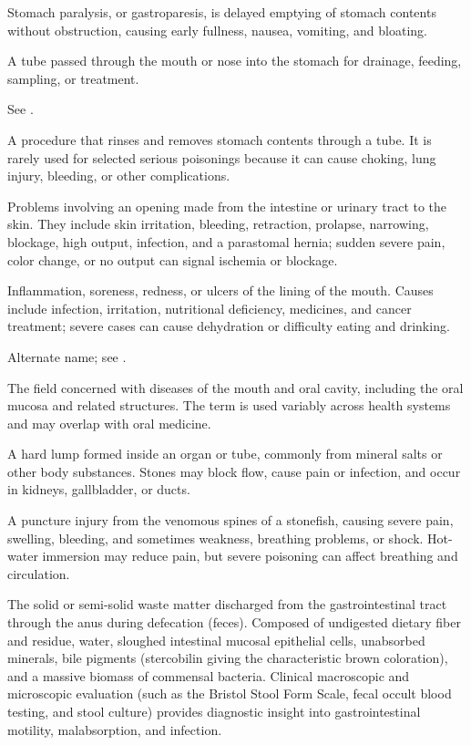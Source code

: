  Stomach paralysis, or gastroparesis, is delayed emptying of stomach contents without obstruction, causing early fullness, nausea, vomiting, and bloating.

 A tube passed through the mouth or nose into the stomach for drainage, feeding, sampling, or treatment.

 See .

 A procedure that rinses and removes stomach contents through a tube. It is rarely used for selected serious poisonings because it can cause choking, lung injury, bleeding, or other complications.

 Problems involving an opening made from the intestine or urinary tract to the skin. They include skin irritation, bleeding, retraction, prolapse, narrowing, blockage, high output, infection, and a parastomal hernia; sudden severe pain, color change, or no output can signal ischemia or blockage.

 Inflammation, soreness, redness, or ulcers of the lining of the mouth. Causes include infection, irritation, nutritional deficiency, medicines, and cancer treatment; severe cases can cause dehydration or difficulty eating and drinking.

 Alternate name; see .

 The field concerned with diseases of the mouth and oral cavity, including the oral mucosa and related structures. The term is used variably across health systems and may overlap with oral medicine.

 A hard lump formed inside an organ or tube, commonly from mineral salts or other body substances. Stones may block flow, cause pain or infection, and occur in kidneys, gallbladder, or ducts.

 A puncture injury from the venomous spines of a stonefish, causing severe pain, swelling, bleeding, and sometimes weakness, breathing problems, or shock. Hot-water immersion may reduce pain, but severe poisoning can affect breathing and circulation.

 The solid or semi-solid waste matter discharged from the gastrointestinal tract through the anus during defecation (feces). Composed of undigested dietary fiber and residue, water, sloughed intestinal mucosal epithelial cells, unabsorbed minerals, bile pigments (stercobilin giving the characteristic brown coloration), and a massive biomass of commensal bacteria. Clinical macroscopic and microscopic evaluation (such as the Bristol Stool Form Scale, fecal occult blood testing, and stool culture) provides diagnostic insight into gastrointestinal motility, malabsorption, and infection.

